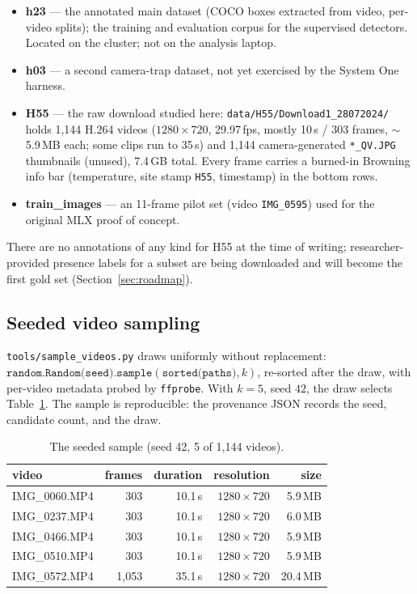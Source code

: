 \documentclass[11pt]{article}
\newcommand{\code}[1]{\texttt{#1}}
\newcommand{\sone}{System One}
\begin{document}
\begin{itemize}
  \item \textbf{h23} --- the annotated main dataset (COCO boxes extracted from
        video, per-video splits); the training and evaluation corpus for the
        supervised detectors. Located on the cluster; not on the analysis
        laptop.
  \item \textbf{h03} --- a second camera-trap dataset, not yet exercised by
        the \sone{} harness.
  \item \textbf{H55} --- the raw download studied here:
        \code{data/H55/Download1\_28072024/} holds 1{,}144 H.264 videos
        ($1280\times720$, 29.97\,fps, mostly 10\,s / 303 frames, $\sim$5.9\,MB
        each; some clips run to 35\,s) and 1{,}144 camera-generated
        \code{*\_QV.JPG} thumbnails (unused), 7.4\,GB total. Every frame
        carries a burned-in Browning info bar (temperature, site stamp
        \code{H55}, timestamp) in the bottom rows.
  \item \textbf{train\_images} --- an 11-frame pilot set (video
        \code{IMG\_0595}) used for the original MLX proof of concept.
\end{itemize}

There are no annotations of any kind for H55 at the time of writing;
researcher-provided presence labels for a subset are being downloaded and will
become the first gold set (Section~\ref{sec:roadmap}).

\subsection{Seeded video sampling}

\code{tools/sample\_videos.py} draws uniformly without replacement:
$\texttt{random.Random(seed)}.\texttt{sample}(\texttt{sorted(paths)}, k)$,
re-sorted after the draw, with per-video metadata probed by \code{ffprobe}.
With $k=5$, seed $42$, the draw selects Table~\ref{tab:sample}. The sample is
reproducible: the provenance JSON records the seed, candidate count, and the
draw.

\begin{table}[t]
\centering
\caption{The seeded sample (seed 42, 5 of 1{,}144 videos).}
\label{tab:sample}
\begin{tabular}{lrrrr}
\toprule
video & frames & duration & resolution & size \\
\midrule
IMG\_0060.MP4 & 303 & 10.1\,s & $1280\times720$ & 5.9\,MB \\
IMG\_0237.MP4 & 303 & 10.1\,s & $1280\times720$ & 6.0\,MB \\
IMG\_0466.MP4 & 303 & 10.1\,s & $1280\times720$ & 5.9\,MB \\
IMG\_0510.MP4 & 303 & 10.1\,s & $1280\times720$ & 5.9\,MB \\
IMG\_0572.MP4 & 1{,}053 & 35.1\,s & $1280\times720$ & 20.4\,MB \\
\bottomrule
\end{tabular}
\end{table}
\end{document}

